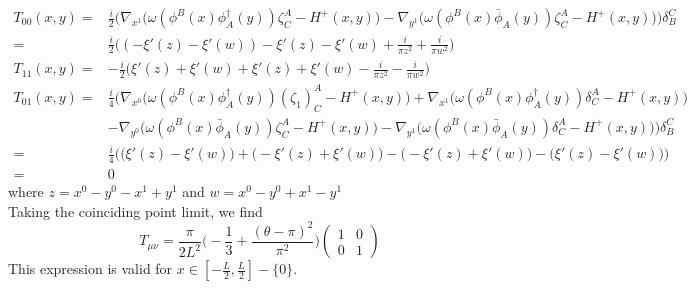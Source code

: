 \begin{equation}\label{vacuum-stressenergy}
\begin{split}
T_{00}(x,y) = 
& \frac{i}{2}\Big(\nabla_{x^1} \big( \omega(\phi^B(x) \phi^\dagger_A(y))\zeta^A_C - H^+(x,y) \big)
- \nabla_{y^1} \big( \omega( \phi^B(x) \bar{\phi}_A(y))\zeta^A_C - H^+(x,y) \big)
\Big)\delta_B^C  \\
= & \frac{i}{2} \big( (-\xi'(z) - \xi'(w)) - \xi'(z) - \xi'(w) + \frac{i}{\pi z^2} + \frac{i}{\pi w^2} \big)   \\
T_{11}(x,y) =
& - \frac{i}{2}\big( \xi'(z) + \xi'(w) + \xi'(z) + \xi'(w) - \frac{i}{\pi z^2} - \frac{i}{\pi w^2}\big) \\
T_{01}(x,y) = 
& \frac{i}{4}\Big(\nabla_{x^0} \big( \omega(\phi^B(x) \phi^\dagger_A(y))(\zeta_1)^A_C - H^+(x,y) \big) + \nabla_{x^1} \big( \omega(\phi^B(x) \phi^\dagger_A(y))\delta^A_C - H^+(x,y) \big)  \\
& - \nabla_{y^0} \big( \omega( \phi^B(x) \bar{\phi}_A(y))\zeta^A_C - H^+(x,y) \big)
- \nabla_{y^1} \big( \omega( \phi^B(x) \bar{\phi}_A(y))\delta^A_C - H^+(x,y) \big)
\Big)\delta_B^C \\
= & \frac{i}{4}\Big( \big( \xi'(z) - \xi'(w) \big) + \big(- \xi'(z) + \xi'(w) \big) - \big( - \xi'(z) + \xi'(w) \big) - \big( \xi'(z) - \xi'(w) \big) \Big) \\
= & 0
\end{split}
\end{equation}
where $z = x^0 - y^0 - x^1 + y^1$ and $w = x^0 - y^0 + x^1 - y^1$ \\
Taking the coinciding point limit, we find
\begin{equation}
T_{\mu\nu} = \frac{ \pi}{2 L^2} \big( -\frac{1}{3} + \frac{(\theta - \pi)^2}{\pi^2}\big)\begin{pmatrix}
1  & 0 \\ 0  &  1
\end{pmatrix}
\end{equation}
This expression is valid for $x\in[-\frac L 2 , \frac L 2] - \{0\}$.
